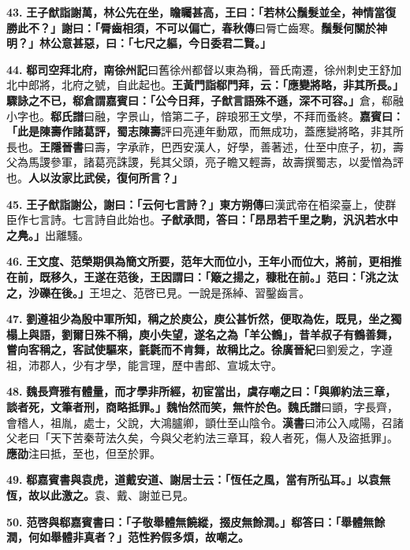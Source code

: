 \textbf{43.} \textbf{王子猷詣謝萬，林公先在坐，瞻矚甚高，王曰：「若林公鬚髮並全，神情當復勝此不？」謝曰：「脣齒相須，不可以偏亡，}{\footnotesize \textbf{春秋傳}曰脣亡齒寒。}\textbf{鬚髮何關於神明？」林公意甚惡，曰：「七尺之軀，今日委君二賢。」}

\textbf{44.} \textbf{郗司空拜北府，}{\footnotesize \textbf{南徐州記}曰舊徐州都督以東為稱，晉氏南遷，徐州刺史王舒加北中郎將，北府之號，自此起也。}\textbf{王黃門詣郗門拜，云：「應變將略，非其所長。」驟詠之不已，郗倉謂嘉賓曰：「公今日拜，子猷言語殊不遜，深不可容。」}{\footnotesize 倉，郗融小字也。\textbf{郗氏譜}曰融，字景山，愔第二子，辟琅邪王文學，不拜而蚤終。}\textbf{嘉賓曰：「此是陳壽作諸葛評，}{\footnotesize \textbf{蜀志陳壽}評曰亮連年動眾，而無成功，蓋應變將略，非其所長也。\textbf{王隱晉書}曰壽，字承祚，巴西安漢人，好學，善著述，仕至中庶子，初，壽父為馬謖參軍，諸葛亮誅謖，髡其父頭，亮子瞻又輕壽，故壽撰蜀志，以愛憎為評也。}\textbf{人以汝家比武侯，復何所言？」}

\textbf{45.} \textbf{王子猷詣謝公，謝曰：「云何七言詩？」}{\footnotesize \textbf{東方朔傳}曰漢武帝在栢梁臺上，使群臣作七言詩。七言詩自此始也。}\textbf{子猷承問，答曰：「昂昂若千里之駒，汎汎若水中之鳧。」}{\footnotesize 出離騷。}

\textbf{46.} \textbf{王文度、范榮期俱為簡文所要，范年大而位小，王年小而位大，將前，更相推在前，既移久，王遂在范後，王因謂曰：「簸之揚之，穅秕在前。」范曰：「洮之汰之，沙礫在後。」}{\footnotesize 王坦之、范啓已見。一說是孫綽、習鑿齒言。}

\textbf{47.} \textbf{劉遵祖少為殷中軍所知，稱之於庾公，庾公甚忻然，便取為佐，既見，坐之獨榻上與語，劉爾日殊不稱，庾小失望，遂名之為「羊公鶴」，昔羊叔子有鶴善舞，嘗向客稱之，客試使驅來，氃氋而不肯舞，故稱比之。}{\footnotesize \textbf{徐廣晉紀}曰劉爰之，字遵祖，沛郡人，少有才學，能言理，歷中書郎、宣城太守。}

\textbf{48.} \textbf{魏長齊雅有體量，而才學非所經，初宦當出，虞存嘲之曰：「與卿約法三章，談者死，文筆者刑，商略抵罪。」魏怡然而笑，無忤於色。}{\footnotesize \textbf{魏氏譜}曰顗，字長齊，會稽人，祖胤，處士，父說，大鴻臚卿，顗仕至山陰令。\textbf{漢書}曰沛公入咸陽，召諸父老曰「天下苦秦苛法久矣，今與父老約法三章耳，殺人者死，傷人及盜抵罪」。\textbf{應劭}注曰抵，至也，但至於罪。}

\textbf{49.} \textbf{郗嘉賓書與袁虎，道戴安道、謝居士云：「恆任之風，當有所弘耳。」以袁無恆，故以此激之。}{\footnotesize 袁、戴、謝並已見。}

\textbf{50.} \textbf{范啓與郗嘉賓書曰：「子敬舉體無饒縱，掇皮無餘潤。」郗答曰：「舉體無餘潤，何如舉體非真者？」范性矜假多煩，故嘲之。}


